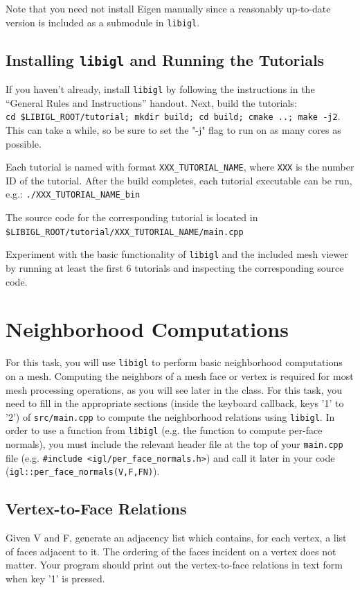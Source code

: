\documentclass[11pt]{amsart}
\begin{document}
Note that you need not install Eigen manually since a reasonably up-to-date
version is included as a submodule in \texttt{libigl}.

\subsection{Installing \texttt{libigl} and Running the Tutorials}
If you haven't already, install \texttt{libigl} by following the
instructions in the ``General Rules and Instructions'' handout.
Next, build the tutorials: \\
\texttt{cd \$LIBIGL\_ROOT/tutorial; mkdir build; cd build; cmake ..; make -j2}.\\
This can take a while, so be sure to set the "-j" flag to run on as many cores
as possible.

\noindent Each tutorial is named with format \texttt{XXX\_TUTORIAL\_NAME},
where \texttt{XXX} is the number ID of the tutorial. After the build completes,
each tutorial executable can be run, e.g.: \texttt{./XXX\_TUTORIAL\_NAME\_bin} 

\noindent The source code for the corresponding tutorial is located in \\
 \texttt{\$LIBIGL\_ROOT/tutorial/XXX\_TUTORIAL\_NAME/main.cpp}

\noindent Experiment with the basic functionality of \texttt{libigl} and the
        included mesh viewer by running at least the first 6 tutorials and
        inspecting the corresponding source code. 

\section{Neighborhood Computations}
For this task, you will use \texttt{libigl} to perform basic neighborhood
computations on a mesh. Computing the neighbors of a mesh face or vertex is
required for most mesh processing operations, as you will see later in the
class. For this task, you need to fill in the appropriate sections (inside the
keyboard callback, keys '1' to '2') of \texttt{src/main.cpp} to compute the
neighborhood relations using \texttt{libigl}. In order to use a
function from \texttt{libigl} (e.g. the function to compute per-face normals),
you must include the relevant header file at the top of your \texttt{main.cpp}
file (e.g. \texttt{\#include <igl/per\_face\_normals.h>}) and call it later in
your code (\texttt{igl::per\_face\_normals(V,F,FN)}).

\subsection{Vertex-to-Face Relations}
Given V and F, generate an adjacency list which contains, for each vertex, a
list of faces adjacent to it. The ordering of the faces incident on a vertex
does not matter. Your program should print out the vertex-to-face relations in
text form when key '1' is pressed.
\end{document}
